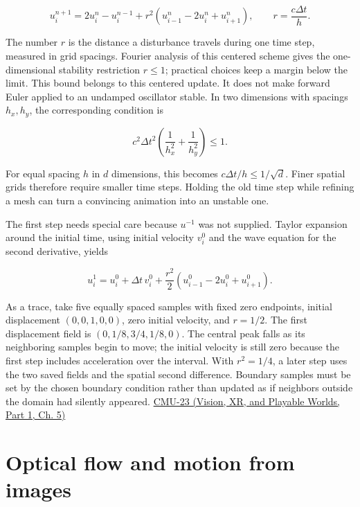\[
u_i^{n+1}=2u_i^n-u_i^{n-1}+r^2(u_{i-1}^n-2u_i^n+u_{i+1}^n),\qquad r=\frac{c\Delta t}{h}.
\]

The number \(r\) is the distance a disturbance travels during one time step, measured in grid spacings. Fourier analysis of this centered scheme gives the one-dimensional stability restriction \(r\leq1\); practical choices keep a margin below the limit. This bound belongs to this centered update. It does not make forward Euler applied to an undamped oscillator stable. In two dimensions with spacings \(h_x,h_y\), the corresponding condition is

\[
c^2\Delta t^2\left(\frac1{h_x^2}+\frac1{h_y^2}\right)\leq1.
\]

For equal spacing \(h\) in \(d\) dimensions, this becomes \(c\Delta t/h\leq1/\sqrt d\). Finer spatial grids therefore require smaller time steps. Holding the old time step while refining a mesh can turn a convincing animation into an unstable one.

The first step needs special care because \(u^{-1}\) was not supplied. Taylor expansion around the initial time, using initial velocity \(v_i^0\) and the wave equation for the second derivative, yields

\[
u_i^1=u_i^0+\Delta t\,v_i^0+\frac{r^2}{2}(u_{i-1}^0-2u_i^0+u_{i+1}^0).
\]

As a trace, take five equally spaced samples with fixed zero endpoints, initial displacement \((0,0,1,0,0)\), zero initial velocity, and \(r=1/2\). The first displacement field is \((0,1/8,3/4,1/8,0)\). The central peak falls as its neighboring samples begin to move; the initial velocity is still zero because the first step includes acceleration over the interval. With \(r^2=1/4\), a later step uses the two saved fields and the spatial second difference. Boundary samples must be set by the chosen boundary condition rather than updated as if neighbors outside the domain had silently appeared. \href{../07-Vision-XR-and-Playable-Worlds-P01/main.pdf\#nameddest=04-visual-computing-ii-ch036-cmu-23---physically-based-animation-and-pdes}{CMU-23 (Vision, XR, and Playable Worlds, Part 1, Ch. 5)}

\section{Optical flow and motion from images}\label{04-visual-computing-ii-ch030-optical-flow-and-motion-from-images}

\hypertarget{04-visual-computing-ii-ch030-optical-flow-and-motion-from-images}{}

